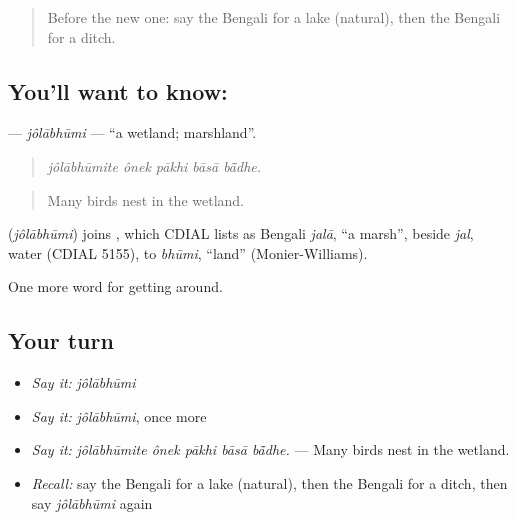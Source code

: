 \label{lesson:BN-C433-jolabhumi}



\begin{quote}
Before the new one: say the Bengali for a lake (natural), then the Bengali for a ditch.
\end{quote}

\subsection*{You'll want to know: }
\textbf{} — \emph{jôlābhūmi} — \textquotedblleft{}a wetland; marshland\textquotedblright{}.

\begin{quote}
    
\end{quote}

\begin{quote}
\emph{jôlābhūmite ônek pākhi bāsā bā̃dhe.}
\end{quote}

\begin{quote}
Many birds nest in the wetland.
\end{quote}

\begin{cousinweb}
\textbf{} (\emph{jôlābhūmi}) joins , which CDIAL lists as Bengali \emph{jalā}, \textquotedblleft{}a marsh\textquotedblright{}, beside \emph{jal}, water (CDIAL 5155), to \emph{bhūmi}, \textquotedblleft{}land\textquotedblright{} (Monier-Williams).
\end{cousinweb}

\begin{grammarlens}[title={What you've built}]
One more word for getting around.
\end{grammarlens}

\subsection*{Your turn}
\begin{itemize}
\raggedright
  \item \emph{Say it:} \emph{jôlābhūmi}
  \item \emph{Say it:} \emph{jôlābhūmi}, once more
  \item \emph{Say it:} \emph{jôlābhūmite ônek pākhi bāsā bā̃dhe.} — Many birds nest in the wetland.
  \item \emph{Recall:} say the Bengali for a lake (natural), then the Bengali for a ditch, then say \emph{jôlābhūmi} again
\end{itemize}

